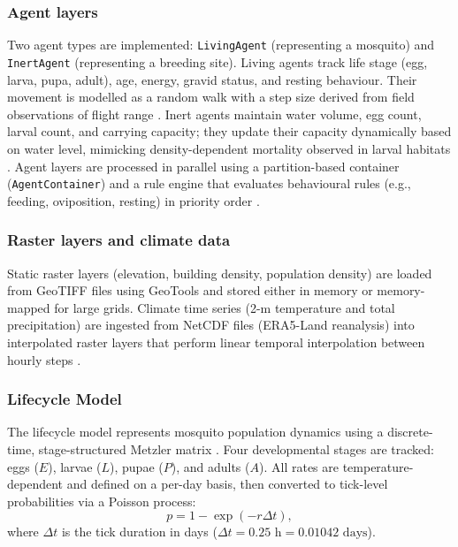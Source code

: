 \documentclass{article}
\begin{document}
\subsubsection{Agent layers}
Two agent types are implemented: \texttt{LivingAgent} (representing a mosquito) and \texttt{InertAgent} (representing a 
breeding site). Living agents track life stage (egg, larva, pupa, adult), age, energy, gravid status, and resting behaviour.
Their movement is modelled as a random walk with a step size derived from field observations of flight range \citep{1966.MA.FRL}. 
Inert agents maintain water volume, egg count, larval count, and carrying capacity; they update their capacity dynamically based on 
water level, mimicking density-dependent mortality observed in larval habitats \citep{2016.ST.OTI}. Agent layers are processed in 
parallel using a partition-based container (\texttt{AgentContainer}) and a rule engine that evaluates behavioural rules (e.g., 
feeding, oviposition, resting) in priority order \citep{2023.ST.ASR}.

\subsubsection{Raster layers and climate data}
Static raster layers (elevation, building density, population density) are loaded from GeoTIFF files using GeoTools and stored either 
in memory or memory-mapped for large grids. Climate time series (2-m temperature and total precipitation) are 
ingested from NetCDF files (ERA5-Land reanalysis) into interpolated raster layers that perform linear temporal interpolation between 
hourly steps \citep{2014.GC.AED, 2017.CL.IMS}.


\subsubsection{Lifecycle Model}
\label{sec:lifecycle}

The lifecycle model represents mosquito population dynamics using a discrete-time, stage-structured Metzler matrix 
\citep{2023.ST.ASR, 2025.KM.WTR}. Four developmental stages are tracked: eggs ($E$), larvae ($L$), pupae ($P$), and adults ($A$). 
All rates are temperature-dependent and defined on a per-day basis, then converted to tick-level probabilities via a Poisson process:
\begin{equation}
    p = 1 - \exp(-r \Delta t),
\end{equation}
where $\Delta t$ is the tick duration in days ($\Delta t = 0.25 \text{ h} = 0.01042 \text{ days}$).
\end{document}

